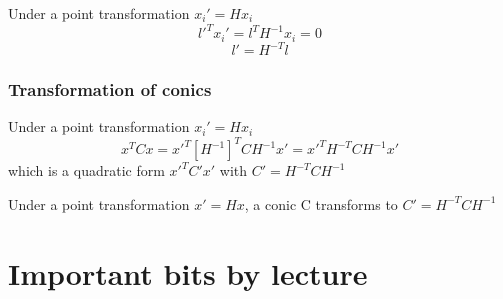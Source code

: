 Under a point transformation \( x_i' = H x_i \)
\[ l'^T x_i' = l^T H^{-1} x_i = 0 \]
\[ l' = H^{-T} l \]

\subsubsection{Transformation of conics}

Under a point transformation \( x_i' = H x_i \)
\[ x^T C x = x'^T {[H^{-1}]}^T C H^{-1} x' 
    = x'^T H^{-T} C H^{-1} x'
\]
which is a quadratic form \( x'^T C' x' \) with \(C' = H^{-T} C H^{-1} \)

Under a point transformation \( x' = H x \), a conic C transforms to \( C' =
H^{-T} C H^{-1} \)

\section{Important bits by lecture}
